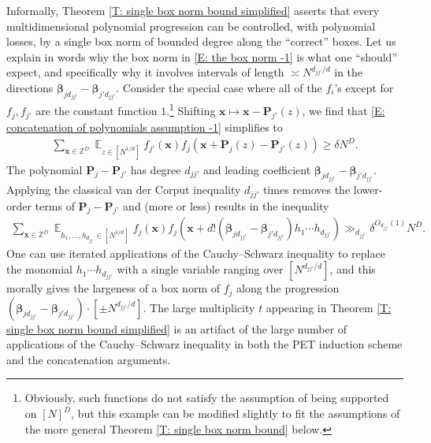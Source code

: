 \documentclass[11pt]{amsart}
\theoremstyle{definition}
\DeclareMathOperator*{\E}{\mathbb{E}}
\newcommand{\Z}{{\mathbb Z}}
\newcommand{\bp}{{\textbf{P}}}
\newcommand{\bx}{{\textbf{x}}}
\newcommand{\bbeta}{{\boldsymbol{\beta}}}
\begin{document}
Informally, Theorem \ref{T: single box norm bound simplified} asserts that every multidimensional polynomial progression can be controlled, with polynomial losses, by a single box norm of bounded degree along the ``correct'' boxes. Let us explain in words why the box norm in \eqref{E: the box norm -1} is what one ``should'' expect, and specifically why it involves intervals of length $\asymp N^{d_{jj'}/d}$ in the directions $\bbeta_{jd_{jj'}}-\bbeta_{j'd_{jj'}}$.   
Consider the special case where
all of the $f_i$'s except for $f_j, f_{j'}$ are the constant function $1$.\footnote{Obviously, such functions do not satisfy the assumption of being supported on $[N]^D$, but this example can be modified slightly to fit the assumptions of the more general Theorem \ref{T: single box norm bound} below.}  Shifting $\bx\mapsto \bx - \bp_{j'}(z)$, we find that \eqref{E: concatenation of polynomials assumption -1} simplifies to 
\begin{align*}
\sum_{\bx\in\Z^D}\E_{z\in[N^{1/d}]}f_{j'}(\bx)f_j(\bx + \bp_j(z) - \bp_{j'}(z)) \geq \delta N^D.
\end{align*}
The polynomial $\bp_j - \bp_{j'}$ has degree $d_{jj'}$ and leading coefficient $\bbeta_{jd_{jj'}}-\bbeta_{j'd_{jj'}}$.
Applying the classical van der Corput inequality $d_{jj'}$ times removes the lower-order terms of $\bp_j - \bp_{j'}$
and (more or less) results in the inequality
\begin{align*}
    \sum_{\bx\in\Z^D}\E_{h_1, \ldots, h_{d_{jj'}}\in [N^{1/d}]}f_j(\bx)f_j(\bx + d!(\bbeta_{jd_{jj'}} -\bbeta_{j'd_{jj'}})h_1\cdots h_{d_{jj'}})\gg_{d_{jj'}}\delta^{O_{d_{jj'}}(1)}N^D.
\end{align*}
One can use iterated applications of the Cauchy--Schwarz inequality to replace the monomial $h_1\cdots h_{d_{jj'}}$ with a single variable ranging over $[N^{d_{jj'}/d}]$, and this morally gives the largeness of a box norm of $f_j$ along the progression $(\bbeta_{jd_{jj'}}-\bbeta_{j'd_{jj'}})\cdot[\pm N^{d_{jj'}/d}]$.  The large multiplicity $t$ appearing in Theorem \ref{T: single box norm bound simplified} is an artifact of the large number of applications of the Cauchy--Schwarz inequality in both the PET induction scheme and the concatenation arguments.
\end{document}
